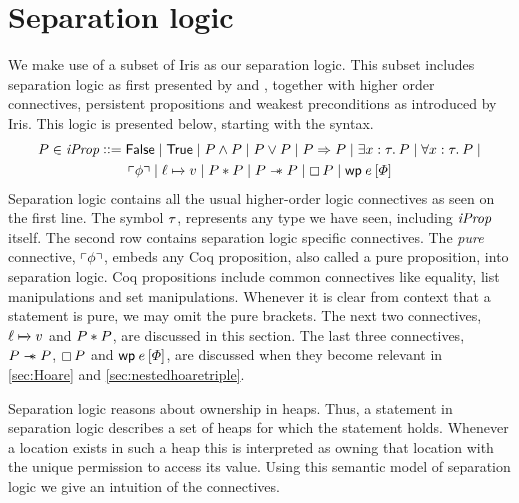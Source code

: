 \documentclass[thesis.tex]{subfiles}
\begin{document}
\section{Separation logic}
\label{sec:seplogic}
We make use of a subset of Iris \cite{jungIrisGroundModular2018} as our separation logic. This subset includes separation logic as first presented by  and  \cite*{ishtiaqBIAssertionLanguage2001,reynoldsSeparationLogicLogic2002b}, together with higher order connectives, persistent propositions and weakest preconditions as introduced by Iris. This logic is presented below, starting with the syntax.
\begin{align*}
    \prop \in \iProp \bnfdef{} & \FALSE \mid \TRUE \mid \prop \land \prop \mid \prop \lor \prop \mid \prop \Ra \prop \mid \Exists \var:\type. \prop \mid \All \var:\type. \prop \mid \\
                               & \pure{\pprop} \mid \loc \fmapsto \val \mid \prop * \prop \mid \prop \wand \prop \mid \always\prop \mid \wpre\expr{\pred}
\end{align*}
Separation logic contains all the usual higher-order logic connectives as seen on the first line. The symbol $\tau$, represents any type we have seen, including $\textit{iProp}$ itself. The second row contains separation logic specific connectives. The \emph{pure} connective, $\left\ulcorner \phi \right\urcorner$, embeds any Coq proposition, also called a pure proposition, into separation logic. Coq propositions include common connectives like equality, list manipulations and set manipulations. Whenever it is clear from context that a statement is pure, we may omit the pure brackets. The next two connectives, $\loc \fmapsto \val$ and $P * P$, are discussed in this section. The last three connectives, $P \mathrel{-\!\!\ast} P$, $\mathop{\boxempty}P$ and $\wpre\expr{\pred}$, are discussed when they become relevant in \cref{sec:Hoare} and \cref{sec:nestedhoaretriple}.

Separation logic reasons about ownership in heaps. Thus, a statement in separation logic describes a set of heaps for which the statement holds. Whenever a location exists in such a heap this is interpreted as owning that location with the unique permission to access its value. Using this semantic model of separation logic we give an intuition of the connectives.
\end{document}
